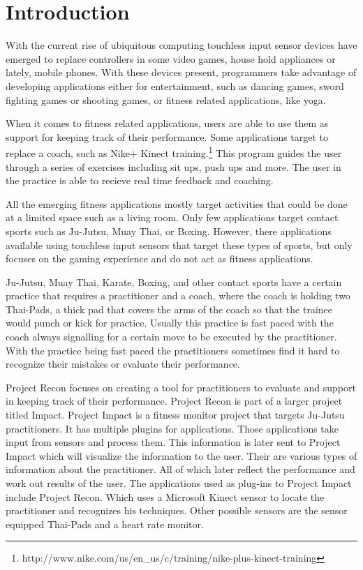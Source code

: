 \chapter{Introduction}
\label{chap:intro}
With the current rise of ubiquitous computing touchless input sensor devices have emerged to replace controllers in some video games, house hold appliances or lately, mobile phones. With these devices present, programmers take advantage of developing applications either for entertainment, such as dancing games, sword fighting games or shooting games, or fitness related applications, like yoga.  

When it comes to fitness related applications, users are able to use them as support for keeping track of their performance. Some applications target to replace a coach, such as Nike+ Kinect training.\footnote{http://www.nike.com/us/en\_us/c/training/nike-plus-kinect-training} This program guides the user through a series of exercises including sit ups, push ups and more. The user in the practice is able to recieve real time feedback and coaching.

All the emerging fitness applications mostly target activities that could be done at a limited space such as a living room. Only few applications target contact sports such as Ju-Jutsu, Muay Thai, or Boxing. However, there applications available using touchless input sensors that target these types of sports, but only focuses on the gaming experience and do not act as fitness applications.

Ju-Jutsu, Muay Thai, Karate, Boxing, and other contact sports have a certain practice that requires a practitioner and a coach, where the coach is holding two Thai-Pads, a thick pad that covers the arms of the coach so that the trainee would punch or kick for practice. Usually this practice is fast paced with the coach always signalling for a certain move to be executed by the practitioner. With the practice being fast paced the practitioners sometimes find it hard to recognize their mistakes or evaluate their performance.

Project Recon focuses on creating a tool for practitioners to evaluate and support in keeping track of their performance. Project Recon is part of a larger project titled Impact. Project Impact is a fitness monitor project that targets Ju-Jutsu practitioners. It has multiple plugins for applications. Those applications take input from sensors and process them. This information is later sent to Project Impact which will visualize the information to the user. Their are various types of information about the practitioner. All of which later reflect the performance and work out results of the user. The applications used as plug-ins to Project Impact include Project Recon. Which uses a Microsoft Kinect sensor to locate the practitioner and recognizes his techniques. Other possible sensors are the sensor equipped Thai-Pads and a heart rate monitor.


